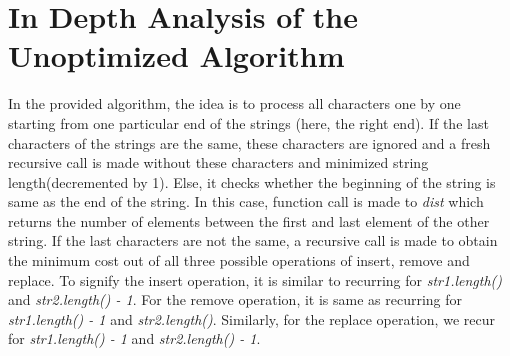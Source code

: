 \documentclass[a4paper,10pt,twoside]{article}
\begin{document}
\section{In Depth Analysis of the Unoptimized Algorithm}

In the provided algorithm, the idea is to process all characters one by one starting from one particular end of the strings (here, the right end). If the last characters of the strings are the same, these characters are ignored and a fresh recursive call is made without these characters and minimized string length(decremented by 1). Else, it checks whether the beginning of the string is same as the end of the string. In this case, function call is made to \textit{dist} which returns the number of elements between the first and last element of the other string. If the last characters are not the same, a recursive call is made to obtain the minimum cost out of all three possible operations of insert, remove and replace. To signify the insert operation, it is similar to recurring for \textit{str1.length()} and \textit{str2.length() - 1}. For the remove operation, it is same as recurring for \textit{str1.length() - 1} and \textit{str2.length()}. Similarly, for the replace operation, we recur for \textit{str1.length() - 1} and \textit{str2.length() - 1}. 
\end{document}
